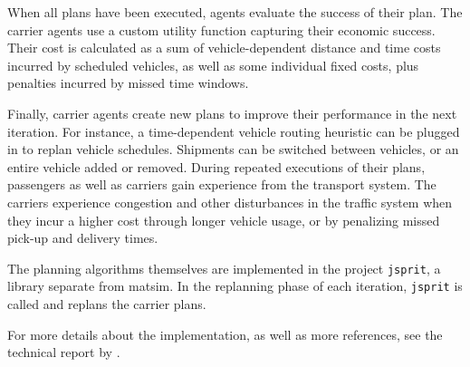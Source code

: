 When all plans have been executed, agents evaluate the success of their plan. The carrier agents use a custom 
utility function capturing their economic success. Their cost is calculated as a sum of vehicle-dependent 
distance and time costs incurred by scheduled vehicles, as well as some individual fixed costs, plus penalties 
incurred by missed time windows.

Finally, carrier agents create new plans to improve their performance in the next iteration. For instance, a time-dependent vehicle routing heuristic can be plugged in to replan vehicle schedules. Shipments can be switched between vehicles, or an entire vehicle added or removed.
During repeated executions of their plans, passengers as well as carriers gain experience from the transport system. The carriers experience congestion and other disturbances in the traffic system when they incur a higher cost through longer vehicle usage, or by penalizing missed pick-up and delivery times.

The planning algorithms themselves are implemented in the project \lstinline|jsprit|, a library separate from \gls{matsim}.
In the replanning phase of each iteration, \lstinline|jsprit| is called and replans the carrier plans.

For more details about the implementation, as well as more references, see the technical report by \citet[][]{ZilskeEtAl_TechRep_VSP_2012}.


